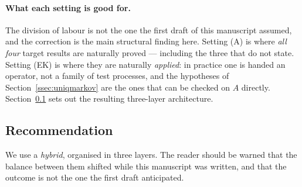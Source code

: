 \documentclass[11pt,a4paper]{article}
\theoremstyle{plain}
\theoremstyle{definition}
\theoremstyle{remark}
\newcommand{\CPS}{\cite{CPS23}}
\begin{document}
\paragraph{What each setting is good for.}
The division of labour is not the one the first draft of this manuscript
assumed, and the correction is the main structural finding here.  Setting (A) is
where \emph{all four} target results are naturally proved --- including the three
that \CPS{} do not state.  Setting (EK) is where they are naturally
\emph{applied}: in practice one is handed an operator, not a family of test
processes, and the hypotheses of Section~\ref{ssec:uniqmarkov} are the ones that
can be checked on $A$ directly.  Section~\ref{ssec:recommendation} sets out the
resulting three-layer architecture.

\subsection{Recommendation}
\label{ssec:recommendation}

We use a \emph{hybrid}, organised in three layers.  The reader should be warned
that the balance between them shifted while this manuscript was written, and
that the outcome is not the one the first draft anticipated.
\end{document}
